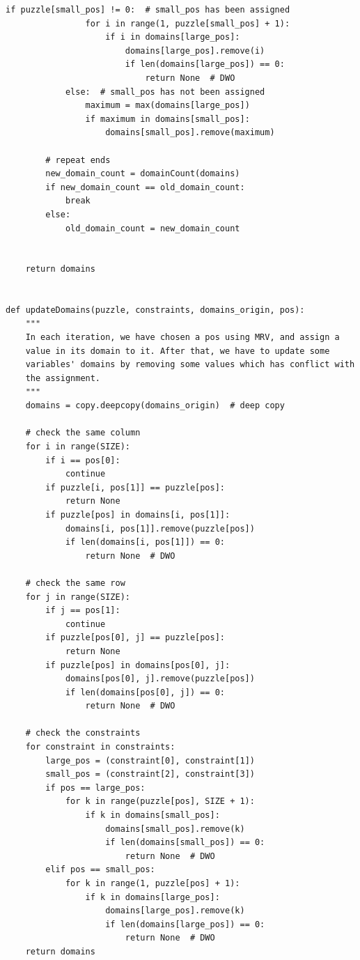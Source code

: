 \documentclass[a4paper, 11pt]{article}
\begin{document}
\begin{lstlisting}[title=python/forward\_checking.py]
            if puzzle[small_pos] != 0:  # small_pos has been assigned
                for i in range(1, puzzle[small_pos] + 1):
                    if i in domains[large_pos]:
                        domains[large_pos].remove(i)
                        if len(domains[large_pos]) == 0:
                            return None  # DWO
            else:  # small_pos has not been assigned
                maximum = max(domains[large_pos])
                if maximum in domains[small_pos]:
                    domains[small_pos].remove(maximum)

        # repeat ends
        new_domain_count = domainCount(domains)
        if new_domain_count == old_domain_count:
            break
        else:
            old_domain_count = new_domain_count


    return domains


def updateDomains(puzzle, constraints, domains_origin, pos):
    """
    In each iteration, we have chosen a pos using MRV, and assign a
    value in its domain to it. After that, we have to update some
    variables' domains by removing some values which has conflict with
    the assignment.
    """
    domains = copy.deepcopy(domains_origin)  # deep copy

    # check the same column
    for i in range(SIZE):
        if i == pos[0]:
            continue
        if puzzle[i, pos[1]] == puzzle[pos]:
            return None
        if puzzle[pos] in domains[i, pos[1]]:
            domains[i, pos[1]].remove(puzzle[pos])
            if len(domains[i, pos[1]]) == 0:
                return None  # DWO

    # check the same row
    for j in range(SIZE):
        if j == pos[1]:
            continue
        if puzzle[pos[0], j] == puzzle[pos]:
            return None
        if puzzle[pos] in domains[pos[0], j]:
            domains[pos[0], j].remove(puzzle[pos])
            if len(domains[pos[0], j]) == 0:
                return None  # DWO

    # check the constraints
    for constraint in constraints:
        large_pos = (constraint[0], constraint[1])
        small_pos = (constraint[2], constraint[3])
        if pos == large_pos:
            for k in range(puzzle[pos], SIZE + 1):
                if k in domains[small_pos]:
                    domains[small_pos].remove(k)
                    if len(domains[small_pos]) == 0:
                        return None  # DWO
        elif pos == small_pos:
            for k in range(1, puzzle[pos] + 1):
                if k in domains[large_pos]:
                    domains[large_pos].remove(k)
                    if len(domains[large_pos]) == 0:
                        return None  # DWO
    return domains



\end{lstlisting}
\end{document}
